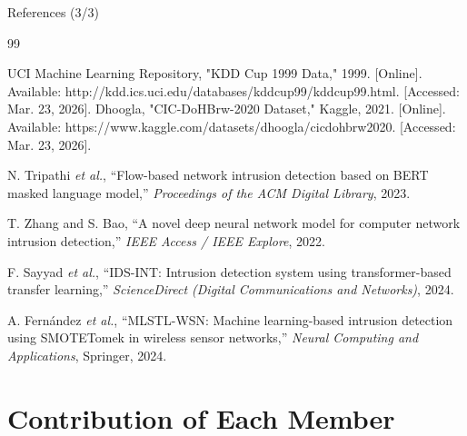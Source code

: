 \documentclass[aspectratio=169,xcolor=dvipsnames]{beamer}
\begin{document}
\begin{frame}{References (3/3)}
\small
\begin{thebibliography}{99}
\setcounter{enumiv}{10} 

UCI Machine Learning Repository,
"KDD Cup 1999 Data," 1999. [Online]. Available: http://kdd.ics.uci.edu/databases/kddcup99/kddcup99.html. [Accessed: Mar. 23, 2026].
Dhoogla,
"CIC-DoHBrw-2020 Dataset," Kaggle, 2021. [Online]. Available: https://www.kaggle.com/datasets/dhoogla/cicdohbrw2020. [Accessed: Mar. 23, 2026].

N. Tripathi \textit{et al.},
``Flow-based network intrusion detection based on BERT masked language model,''
\emph{Proceedings of the ACM Digital Library}, 2023.

T. Zhang and S. Bao,
``A novel deep neural network model for computer network intrusion detection,''
\emph{IEEE Access / IEEE Explore}, 2022.

F. Sayyad \textit{et al.},
``IDS-INT: Intrusion detection system using transformer-based transfer learning,''
\emph{ScienceDirect (Digital Communications and Networks)}, 2024.

A. Fernández \textit{et al.},
``MLSTL-WSN: Machine learning-based intrusion detection using SMOTETomek in wireless sensor networks,''
\emph{Neural Computing and Applications}, Springer, 2024.

\end{thebibliography}
\end{frame}




\section{Contribution of Each Member}
\end{document}
